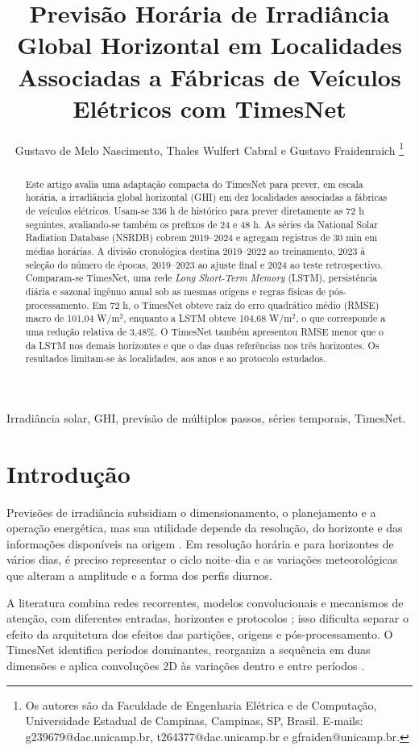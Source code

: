 \documentclass[10pt,conference,a4paper]{IEEEtran}
\title{Previsão Horária de Irradiância Global Horizontal em Localidades
Associadas a Fábricas de Veículos Elétricos com TimesNet}
\author{Gustavo de Melo Nascimento, Thales Wulfert Cabral e Gustavo Fraidenraich%
\thanks{Os autores são da Faculdade de Engenharia Elétrica e de Computação,
Universidade Estadual de Campinas, Campinas, SP, Brasil. E-mails:
g239679@dac.unicamp.br, t264377@dac.unicamp.br e gfraiden@unicamp.br.}}
\begin{document}
\maketitle

\begin{abstract}
Este artigo avalia uma adaptação compacta do TimesNet para prever, em escala
horária, a irradiância global horizontal (GHI) em dez localidades associadas
a fábricas de veículos elétricos. Usam-se 336 h de histórico para prever
diretamente as 72 h seguintes, avaliando-se também os prefixos de 24 e 48 h.
As séries da National Solar Radiation Database (NSRDB) cobrem 2019--2024 e
agregam registros de 30 min em médias horárias. A divisão cronológica destina
2019--2022 ao treinamento, 2023 à seleção do número de épocas, 2019--2023 ao
ajuste final e 2024 ao teste retrospectivo. Comparam-se TimesNet, uma rede
\textit{Long Short-Term Memory} (LSTM), persistência diária e sazonal ingênuo
anual sob as mesmas origens e regras físicas de pós-processamento.
Em 72 h, o TimesNet obteve raiz do erro quadrático médio (RMSE) macro de
101,04 W/m$^2$, enquanto a LSTM obteve 104,68 W/m$^2$, o que corresponde a uma
redução relativa de 3,48\%. O TimesNet também apresentou RMSE menor que o da
LSTM nos demais horizontes e que o das duas referências nos três horizontes.
Os resultados limitam-se às localidades, aos anos e ao protocolo estudados.
\end{abstract}

\begin{IEEEkeywords}
Irradiância solar, GHI, previsão de múltiplos passos, séries temporais,
TimesNet.
\end{IEEEkeywords}

\section{Introdução}
\label{sec:introducao}

Previsões de irradiância subsidiam o dimensionamento, o planejamento e a
operação energética, mas sua utilidade depende da resolução, do horizonte e
das informações disponíveis na origem
\cite{antonanzas2016,voyant2017,yang2018}. Em resolução horária e para
horizontes de vários dias, é preciso representar o ciclo noite--dia e as
variações meteorológicas que alteram a amplitude e a forma dos perfis diurnos.

A literatura combina redes recorrentes, modelos convolucionais e mecanismos
de atenção, com diferentes entradas, horizontes e protocolos
\cite{voyant2017}; isso dificulta separar o efeito da arquitetura dos efeitos
das partições, origens e pós-processamento. O TimesNet identifica períodos
dominantes, reorganiza a sequência em duas dimensões e aplica convoluções 2D
às variações dentro e entre períodos \cite{wu2023}.
\end{document}
